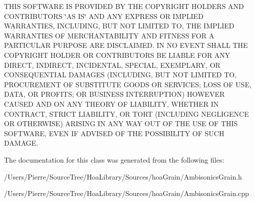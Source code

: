 T\-H\-I\-S S\-O\-F\-T\-W\-A\-R\-E I\-S P\-R\-O\-V\-I\-D\-E\-D B\-Y T\-H\-E C\-O\-P\-Y\-R\-I\-G\-H\-T H\-O\-L\-D\-E\-R\-S A\-N\-D C\-O\-N\-T\-R\-I\-B\-U\-T\-O\-R\-S \char`\"{}\-A\-S I\-S\char`\"{} A\-N\-D A\-N\-Y E\-X\-P\-R\-E\-S\-S O\-R I\-M\-P\-L\-I\-E\-D W\-A\-R\-R\-A\-N\-T\-I\-E\-S, I\-N\-C\-L\-U\-D\-I\-N\-G, B\-U\-T N\-O\-T L\-I\-M\-I\-T\-E\-D T\-O, T\-H\-E I\-M\-P\-L\-I\-E\-D W\-A\-R\-R\-A\-N\-T\-I\-E\-S O\-F M\-E\-R\-C\-H\-A\-N\-T\-A\-B\-I\-L\-I\-T\-Y A\-N\-D F\-I\-T\-N\-E\-S\-S F\-O\-R A P\-A\-R\-T\-I\-C\-U\-L\-A\-R P\-U\-R\-P\-O\-S\-E A\-R\-E D\-I\-S\-C\-L\-A\-I\-M\-E\-D. I\-N N\-O E\-V\-E\-N\-T S\-H\-A\-L\-L T\-H\-E C\-O\-P\-Y\-R\-I\-G\-H\-T H\-O\-L\-D\-E\-R O\-R C\-O\-N\-T\-R\-I\-B\-U\-T\-O\-R\-S B\-E L\-I\-A\-B\-L\-E F\-O\-R A\-N\-Y D\-I\-R\-E\-C\-T, I\-N\-D\-I\-R\-E\-C\-T, I\-N\-C\-I\-D\-E\-N\-T\-A\-L, S\-P\-E\-C\-I\-A\-L, E\-X\-E\-M\-P\-L\-A\-R\-Y, O\-R C\-O\-N\-S\-E\-Q\-U\-E\-N\-T\-I\-A\-L D\-A\-M\-A\-G\-E\-S (I\-N\-C\-L\-U\-D\-I\-N\-G, B\-U\-T N\-O\-T L\-I\-M\-I\-T\-E\-D T\-O, P\-R\-O\-C\-U\-R\-E\-M\-E\-N\-T O\-F S\-U\-B\-S\-T\-I\-T\-U\-T\-E G\-O\-O\-D\-S O\-R S\-E\-R\-V\-I\-C\-E\-S; L\-O\-S\-S O\-F U\-S\-E, D\-A\-T\-A, O\-R P\-R\-O\-F\-I\-T\-S; O\-R B\-U\-S\-I\-N\-E\-S\-S I\-N\-T\-E\-R\-R\-U\-P\-T\-I\-O\-N) H\-O\-W\-E\-V\-E\-R C\-A\-U\-S\-E\-D A\-N\-D O\-N A\-N\-Y T\-H\-E\-O\-R\-Y O\-F L\-I\-A\-B\-I\-L\-I\-T\-Y, W\-H\-E\-T\-H\-E\-R I\-N C\-O\-N\-T\-R\-A\-C\-T, S\-T\-R\-I\-C\-T L\-I\-A\-B\-I\-L\-I\-T\-Y, O\-R T\-O\-R\-T (I\-N\-C\-L\-U\-D\-I\-N\-G N\-E\-G\-L\-I\-G\-E\-N\-C\-E O\-R O\-T\-H\-E\-R\-W\-I\-S\-E) A\-R\-I\-S\-I\-N\-G I\-N A\-N\-Y W\-A\-Y O\-U\-T O\-F T\-H\-E U\-S\-E O\-F T\-H\-I\-S S\-O\-F\-T\-W\-A\-R\-E, E\-V\-E\-N I\-F A\-D\-V\-I\-S\-E\-D O\-F T\-H\-E P\-O\-S\-S\-I\-B\-I\-L\-I\-T\-Y O\-F S\-U\-C\-H D\-A\-M\-A\-G\-E. 

The documentation for this class was generated from the following files\-:\begin{DoxyCompactItemize}
\item 
/\-Users/\-Pierre/\-Source\-Tree/\-Hoa\-Library/\-Sources/hoa\-Grain/Ambisonics\-Grain.\-h\item 
/\-Users/\-Pierre/\-Source\-Tree/\-Hoa\-Library/\-Sources/hoa\-Grain/Ambisonics\-Grain.\-cpp\end{DoxyCompactItemize}
